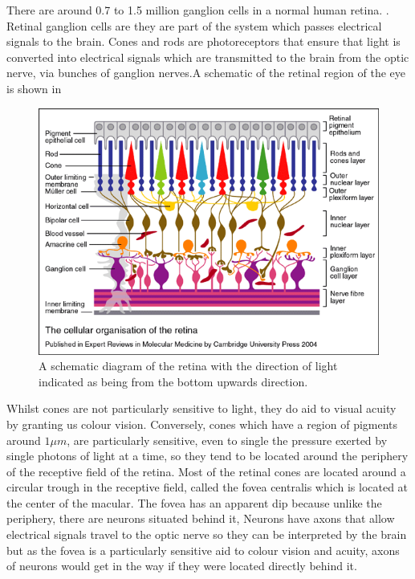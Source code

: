 There are around 0.7 to 1.5 million ganglion cells in a normal human retina.
\cite{curcio1990topography}. Retinal ganglion cells are  they are part of
the system which passes electrical signals to the brain.
\cite{meyer1995characterization} Cones and rods are photoreceptors that ensure
that light is converted into electrical signals which are transmitted to the
brain from the optic nerve, via bunches of ganglion nerves.A schematic
of the retinal region of the eye is shown in 

\begin{figure}[htbp]
  \centering
    \includegraphics{figures/retina}
  \caption{A schematic diagram of the retina with the direction of light indicated
  as being from the bottom upwards direction.}
  \label{fig:retina}
\end{figure}

Whilst cones are not particularly sensitive to light, they do aid to visual
acuity by granting us colour vision.\cite{bowmaker1980visual} Conversely, cones
which have a region of pigments around $1\mu{m}$, are particularly sensitive,
even to single the pressure exerted by single photons of light at a time,
so they tend to be located around the periphery of the receptive field of
the retina.\cite{liebman1964sensitive,baylor1979responses} 
Most of the retinal cones are located around a circular trough in the
receptive field, called the fovea centralis which is located at the center
of the macular.\cite{hendrickson1994primate} The fovea has an apparent dip
because unlike the periphery, there are neurons situated behind it, Neurons
have axons that allow electrical signals travel to the optic nerve so they
can be interpreted by the brain but as the fovea is a particularly sensitive
aid to colour vision and acuity, axons of neurons would get in the way if
they were located directly behind it.

